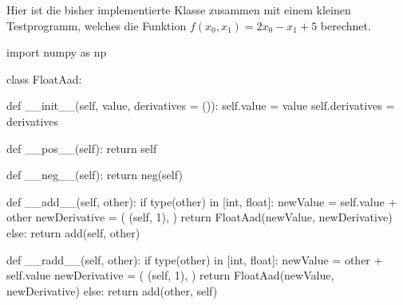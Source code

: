 \documentclass[
  a4paper,
  DIV=11]{scrreprt}
\newenvironment{Shaded}{\begin{snugshade}}{\end{snugshade}}
\newcommand{\BuiltInTok}[1]{\textcolor[rgb]{0.00,0.23,0.31}{#1}}
\newcommand{\ControlFlowTok}[1]{\textcolor[rgb]{0.00,0.23,0.31}{#1}}
\newcommand{\DecValTok}[1]{\textcolor[rgb]{0.68,0.00,0.00}{#1}}
\newcommand{\FunctionTok}[1]{\textcolor[rgb]{0.28,0.35,0.67}{#1}}
\newcommand{\ImportTok}[1]{\textcolor[rgb]{0.00,0.46,0.62}{#1}}
\newcommand{\KeywordTok}[1]{\textcolor[rgb]{0.00,0.23,0.31}{#1}}
\newcommand{\NormalTok}[1]{\textcolor[rgb]{0.00,0.23,0.31}{#1}}
\newcommand{\OperatorTok}[1]{\textcolor[rgb]{0.37,0.37,0.37}{#1}}
\newcommand{\VariableTok}[1]{\textcolor[rgb]{0.07,0.07,0.07}{#1}}
\theoremstyle{definition}
\theoremstyle{definition}
\theoremstyle{remark}
\begin{document}
Hier ist die bisher implementierte Klasse zusammen mit einem kleinen
Testprogramm, welches die Funktion \(f(x_0, x_1) = 2x_0 - x_1 + 5\)
berechnet.

\begin{Shaded}
\begin{Highlighting}[]
\ImportTok{import}\NormalTok{ numpy }\ImportTok{as}\NormalTok{ np}

\KeywordTok{class}\NormalTok{ FloatAad:}

    \KeywordTok{def} \FunctionTok{\_\_init\_\_}\NormalTok{(}\VariableTok{self}\NormalTok{, value, derivatives }\OperatorTok{=}\NormalTok{ ()):}
        \VariableTok{self}\NormalTok{.value }\OperatorTok{=}\NormalTok{ value}
        \VariableTok{self}\NormalTok{.derivatives }\OperatorTok{=}\NormalTok{ derivatives}

    \KeywordTok{def} \FunctionTok{\_\_pos\_\_}\NormalTok{(}\VariableTok{self}\NormalTok{):}
        \ControlFlowTok{return} \VariableTok{self}

    \KeywordTok{def} \FunctionTok{\_\_neg\_\_}\NormalTok{(}\VariableTok{self}\NormalTok{):}
        \ControlFlowTok{return}\NormalTok{ neg(}\VariableTok{self}\NormalTok{)}

    \KeywordTok{def} \FunctionTok{\_\_add\_\_}\NormalTok{(}\VariableTok{self}\NormalTok{, other):}
        \ControlFlowTok{if} \BuiltInTok{type}\NormalTok{(other) }\KeywordTok{in}\NormalTok{ [}\BuiltInTok{int}\NormalTok{, }\BuiltInTok{float}\NormalTok{]:}
\NormalTok{            newValue }\OperatorTok{=} \VariableTok{self}\NormalTok{.value }\OperatorTok{+}\NormalTok{ other}
\NormalTok{            newDerivative }\OperatorTok{=}\NormalTok{ (}
\NormalTok{                (}\VariableTok{self}\NormalTok{, }\DecValTok{1}\NormalTok{),}
\NormalTok{            )}
            \ControlFlowTok{return}\NormalTok{ FloatAad(newValue, newDerivative)}
        \ControlFlowTok{else}\NormalTok{:}
            \ControlFlowTok{return}\NormalTok{ add(}\VariableTok{self}\NormalTok{, other)}
        
    \KeywordTok{def} \FunctionTok{\_\_radd\_\_}\NormalTok{(}\VariableTok{self}\NormalTok{, other):}
        \ControlFlowTok{if} \BuiltInTok{type}\NormalTok{(other) }\KeywordTok{in}\NormalTok{ [}\BuiltInTok{int}\NormalTok{, }\BuiltInTok{float}\NormalTok{]:}
\NormalTok{            newValue }\OperatorTok{=}\NormalTok{ other }\OperatorTok{+} \VariableTok{self}\NormalTok{.value}
\NormalTok{            newDerivative }\OperatorTok{=}\NormalTok{ (}
\NormalTok{                (}\VariableTok{self}\NormalTok{, }\DecValTok{1}\NormalTok{),}
\NormalTok{            )}
            \ControlFlowTok{return}\NormalTok{ FloatAad(newValue, newDerivative)}
        \ControlFlowTok{else}\NormalTok{:}
            \ControlFlowTok{return}\NormalTok{ add(other, }\VariableTok{self}\NormalTok{)}
    

\end{Highlighting}
\end{Shaded}
\end{document}
